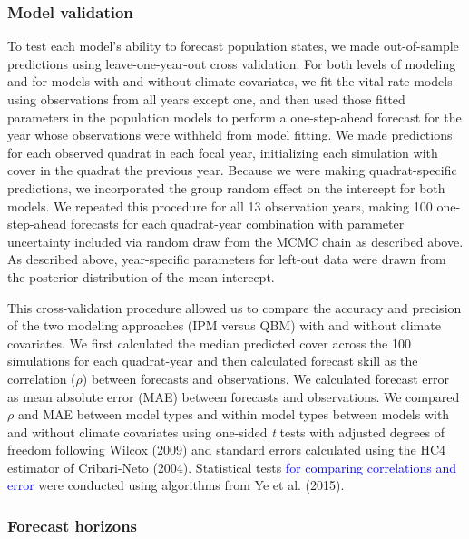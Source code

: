 \documentclass[12pt,]{article}
\begin{document}
\subsubsection{Model validation}\label{model-validation}

To test each model's ability to forecast population states, we made
out-of-sample predictions using leave-one-year-out cross validation. For
both levels of modeling and for models with and without climate
covariates, we fit the vital rate models using observations from all
years except one, and then used those fitted parameters in the
population models to perform a one-step-ahead forecast for the year
whose observations were withheld from model fitting. We made predictions
for each observed quadrat in each focal year, initializing each
simulation with cover in the quadrat the previous year. Because we were
making quadrat-specific predictions, we incorporated the group random
effect on the intercept for both models. We repeated this procedure for
all 13 observation years, making 100 one-step-ahead forecasts for each
quadrat-year combination with parameter uncertainty included via random
draw from the MCMC chain as described above. As described above,
year-specific parameters for left-out data were drawn from the posterior
distribution of the mean intercept.

This cross-validation procedure allowed us to compare the accuracy and
precision of the two modeling approaches (IPM versus QBM) with and
without climate covariates. We first calculated the median predicted
cover across the 100 simulations for each quadrat-year and then
calculated forecast skill as the correlation (\(\rho\)) between
forecasts and observations. We calculated forecast error as mean
absolute error (MAE) between forecasts and observations. We compared
\(\rho\) and MAE between model types and within model types between
models with and without climate covariates using one-sided \emph{t}
tests with adjusted degrees of freedom following Wilcox (2009) and
standard errors calculated using the HC4 estimator of Cribari-Neto
(2004). Statistical tests
\textcolor{blue}{for comparing correlations and error} were conducted
using algorithms from Ye et al. (2015).

\subsubsection{Forecast horizons}\label{forecast-horizons}
\end{document}
